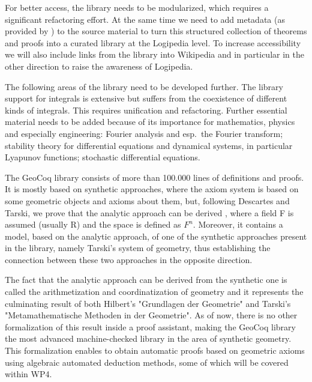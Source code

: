 \begin{workpackage}[id=libraries,wphases=0-48,type=RTD,
  short=Libraries,%
  title=Libraries,
  lead=Inr,
  InrRM=10,
  TumRM=42]
\begin{tasklist}
\begin{task}[id=isaAnalysisProb,title=The Isabelle Analysis \&
  Probability Theory library]
For better access, the library needs to be modularized, which requires
a significant refactoring effort.  At the same time we need to add
metadata (as provided by ) to the source material
to turn this structured collection of theorems and proofs into a
curated library at the Logipedia level. To increase accessibility
we will also include links from the library into Wikipedia and in
particular in the other direction to raise the awareness of Logipedia.

The following areas of the library need to be developed further. The
library support for integrals is extensive but suffers from the
coexistence of different kinds of integrals. This requires unification
and refactoring. Further essential material needs to be added because
of its importance for mathematics, physics and especially engineering: Fourier
analysis and esp.\ the Fourier transform; stability theory for
differential equations and dynamical systems, in particular Lyapunov
functions; stochastic differential equations.
\end{task}

\begin{task}[id=geocoq,title=The GeoCoq library]

The GeoCoq library consists of more than 100.000 lines of definitions and proofs. It is mostly based on synthetic approaches, where the axiom system is based on some geometric objects and axioms about them, but, following Descartes and Tarski, we prove that the analytic approach can be derived , where a field F is assumed (usually R) and the space is defined as $F^n$. Moreover, it contains a model, based on the analytic approach, of one of the synthetic approaches present in the library, namely Tarski's system of geometry, thus establishing the connection between these two approaches in the opposite direction.

The fact that the analytic approach can be derived from the synthetic one is called the arithmetization and coordinatization of geometry and it represents the culminating result of both Hilbert's "Grundlagen der Geometrie" and Tarski's "Metamathematische Methoden in der Geometrie". As of now, there is no other formalization of this result inside a proof assistant, making the GeoCoq library the most advanced machine-checked library in the area of synthetic geometry. This formalization enables to obtain automatic proofs based on geometric axioms using algebraic automated deduction methods, some of which will be covered within WP4.


\end{task}
\end{tasklist}
\end{workpackage}
